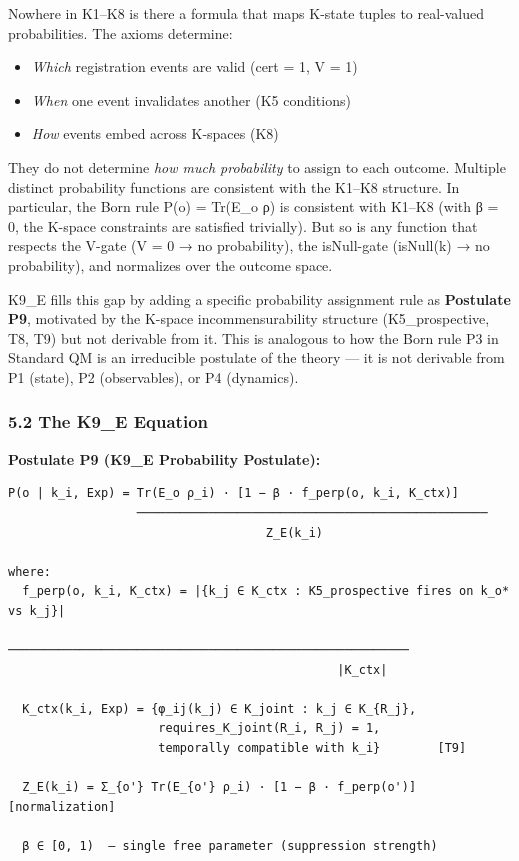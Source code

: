 \documentclass[
  11pt,
]{article}
\providecommand{\tightlist}{%
  \setlength{\itemsep}{0pt}\setlength{\parskip}{0pt}}
\begin{document}
Nowhere in K1--K8 is there a formula that maps K-state tuples to
real-valued probabilities. The axioms determine:

\begin{itemize}
\tightlist
\item
  \emph{Which} registration events are valid (cert = 1, V = 1)
\item
  \emph{When} one event invalidates another (K5 conditions)
\item
  \emph{How} events embed across K-spaces (K8)
\end{itemize}

They do not determine \emph{how much probability} to assign to each
outcome. Multiple distinct probability functions are consistent with the
K1--K8 structure. In particular, the Born rule P(o) = Tr(E\_o ρ) is
consistent with K1--K8 (with β = 0, the K-space constraints are
satisfied trivially). But so is any function that respects the V-gate (V
= 0 → no probability), the isNull-gate (isNull(k) → no probability), and
normalizes over the outcome space.

K9\_E fills this gap by adding a specific probability assignment rule as
\textbf{Postulate P9}, motivated by the K-space incommensurability
structure (K5\_prospective, T8, T9) but not derivable from it. This is
analogous to how the Born rule P3 in Standard QM is an irreducible
postulate of the theory --- it is not derivable from P1 (state), P2
(observables), or P4 (dynamics).

\subsubsection{5.2 The K9\_E Equation}\label{the-k9_e-equation}

\textbf{Postulate P9 (K9\_E Probability Postulate):}

\begin{verbatim}
P(o | k_i, Exp) = Tr(E_o ρ_i) · [1 − β · f_perp(o, k_i, K_ctx)]
                  ─────────────────────────────────────────────────
                                    Z_E(k_i)

where:
  f_perp(o, k_i, K_ctx) = |{k_j ∈ K_ctx : K5_prospective fires on k_o* vs k_j}|
                           ────────────────────────────────────────────────────────
                                              |K_ctx|

  K_ctx(k_i, Exp) = {φ_ij(k_j) ∈ K_joint : k_j ∈ K_{R_j},
                     requires_K_joint(R_i, R_j) = 1,
                     temporally compatible with k_i}        [T9]

  Z_E(k_i) = Σ_{o'} Tr(E_{o'} ρ_i) · [1 − β · f_perp(o')]  [normalization]

  β ∈ [0, 1)  — single free parameter (suppression strength)
\end{verbatim}
\end{document}
